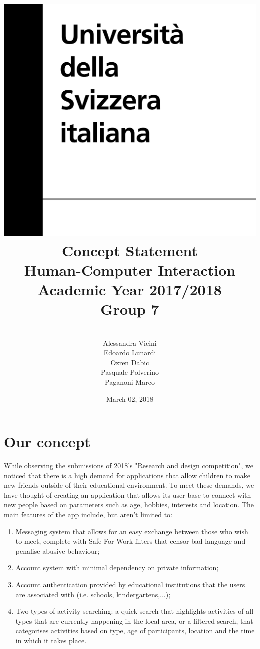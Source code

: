 \documentclass[12pt]{report}
\title {
	\includegraphics[width = .2\linewidth]{University-of-Lugano.png} \break \break
	{\bf\Huge Concept Statement}
	\\\large Human-Computer Interaction
	\\\small Academic Year 2017/2018 \break
	\\\large \textbf{Group 7}}
\author{
	\\\large Alessandra Vicini \\ Edoardo Lunardi \\ Ozren Dabic \\ Pasquale Polverino \\ Paganoni Marco}
\date{March 02, 2018}
\begin{document}
	\pagestyle{empty}
	\maketitle
	\section*{\huge Our concept}
		While observing the submissions of 2018's "Research and design competition",
		we noticed that there is a high demand for applications that allow children
	 	to make new friends outside of their educational environment. To meet these
	  demands, we have thought of creating an application that allows its user base
		to connect with new people based on parameters such as age, hobbies, interests
		and location. The main features of the app include, but aren't limited to:
	\begin{enumerate}
		\item Messaging system that allows for an easy exchange between those who wish
		 			to meet, complete with Safe For Work filters that censor bad language and
		  		penalise abusive behaviour;
		\item Account system with minimal dependency on private information;
		\item Account authentication provided by educational institutions that the
					users are associated with (i.e. schools, kindergartens,...);
		\item Two types of activity searching: a quick search that highlights activities
		 			of all types that are currently happening in the local area, or a filtered
		  		search, that categorises activities based on type, age of participants,
			 		location and the time in which it takes place.
	\end{enumerate}

	
\end{document}
